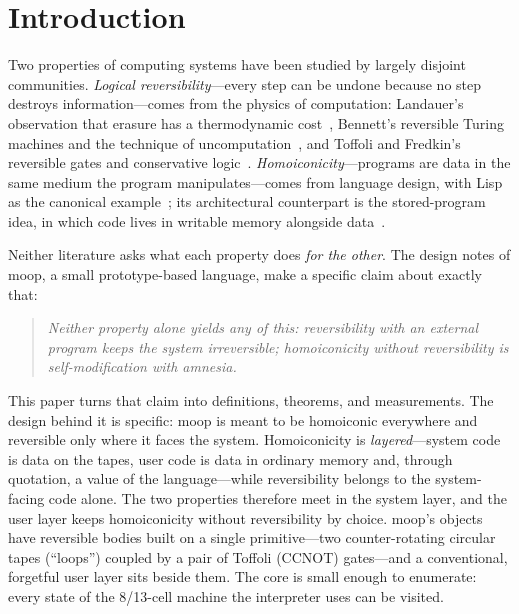\documentclass[11pt]{article}
\theoremstyle{definition}
\theoremstyle{remark}
\newcommand{\moop}{\textsf{moop}}
\begin{document}
\section{Introduction}
\label{sec:intro}

Two properties of computing systems have been studied by largely
disjoint communities. \emph{Logical reversibility}---every step can be
undone because no step destroys information---comes from the physics of
computation: Landauer's observation that erasure has a thermodynamic
cost~\cite{landauer1961}, Bennett's reversible Turing machines and the
technique of uncomputation~\cite{bennett1973,bennett1989}, and Toffoli and
Fredkin's reversible gates and conservative
logic~\cite{toffoli1980,fredkin1982}. \emph{Homoiconicity}---programs are
data in the same medium the program manipulates---comes from language
design, with Lisp as the canonical example~\cite{mccarthy1960}; its
architectural counterpart is the stored-program idea, in which code lives
in writable memory alongside data~\cite{vonneumann1945}.

Neither literature asks what each property does \emph{for the other}.
The design notes of \moop{}, a small prototype-based language, make a
specific claim about exactly that:
\begin{quote}
\emph{Neither property alone yields any of this: reversibility with an
external program keeps the system irreversible; homoiconicity without
reversibility is self-modification with amnesia.}
\end{quote}
This paper turns that claim into definitions, theorems, and
measurements. The design behind it is specific: \moop{} is meant to be
homoiconic everywhere and reversible only where it faces the system.
Homoiconicity is \emph{layered}---system code is data on the tapes, user
code is data in ordinary memory and, through quotation, a value of the
language---while reversibility belongs to the system-facing code alone. The two properties therefore meet in the
system layer, and the user layer keeps homoiconicity without
reversibility by choice. \moop{}'s objects have reversible bodies built on a single
primitive---two counter-rotating circular tapes (``loops'') coupled by a
pair of Toffoli (CCNOT) gates---and a conventional, forgetful user layer
sits beside them. The core is small enough to enumerate: every state of
the 8/13-cell machine the interpreter uses can be visited.
\end{document}
